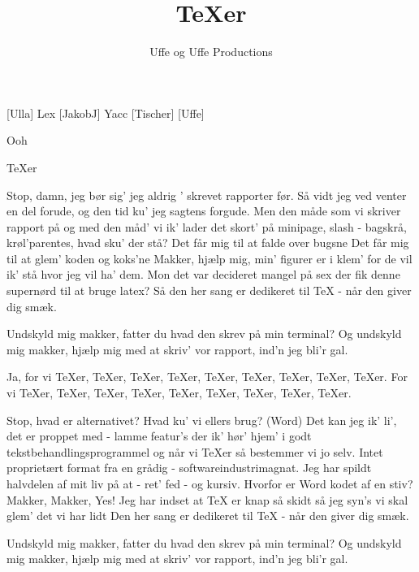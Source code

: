 \documentclass[a4paper,11pt]{article}
\title{TeXer}
\author{Uffe og Uffe Productions}
\begin{document}
\maketitle

\begin{roles}
[Ulla] Lex
[JakobJ] Yacc
[Tischer]
[Uffe]
\end{roles}

\begin{props}
\prop{}
\end{props}

  
\begin{song}

Ooh

TeXer

Stop, damn, jeg bør
sig' jeg aldrig ' skrevet rapporter før.
Så vidt jeg ved venter en del forude,
og den tid ku' jeg sagtens forgude.
Men den måde som vi skriver rapport på
og med den måd' vi ik' lader det skort' på
minipage, slash - bagskrå, krøl'parentes, hvad sku' der stå?
Det får mig til at falde over bugsne
Det får mig til at glem' koden og koks'ne
Makker, hjælp mig, min' figurer er i klem'
for de vil ik' stå hvor jeg vil ha' dem.
Mon det var decideret mangel på sex
der fik denne supernørd til at bruge latex?
Så den her sang er dedikeret til TeX
- når den giver dig smæk.


Undskyld mig makker, fatter du hvad den skrev på min terminal?
Og undskyld mig makker, hjælp mig med at skriv' vor rapport, ind'n jeg bli'r gal.

Ja, for vi TeXer, TeXer, TeXer, TeXer, TeXer, TeXer, TeXer, TeXer, TeXer.
For vi TeXer, TeXer, TeXer, TeXer, TeXer, TeXer, TeXer, TeXer, TeXer.


Stop, hvad er alternativet?
Hvad ku' vi ellers brug? (Word)
Det kan jeg ik' li',
det er proppet med - lamme featur's der ik' hør' hjem' i
godt tekstbehandlingsprogrammel
og når vi TeXer så bestemmer vi jo selv.
Intet proprietært format
fra en grådig - softwareindustrimagnat.
Jeg har spildt halvdelen af mit liv
på at - ret' fed - og kursiv.
Hvorfor er Word kodet af en stiv?
Makker, Makker, Yes!
Jeg har indset at TeX er knap så skidt
så jeg syn's vi skal glem' det vi har lidt
Den her sang er dedikeret til TeX
- når den giver dig smæk.

Undskyld mig makker, fatter du hvad den skrev på min terminal?
Og undskyld mig makker, hjælp mig med at skriv' vor rapport, ind'n jeg bli'r gal.


\end{song}
\end{document}
